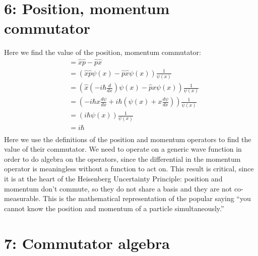 \documentclass[10pt]{article} %
\begin{document}
\section{6: Position, momentum commutator}
Here we find the value of the position, momentum commutator:
\begin{align*}
  [\hat{x}, \hat{p}] &= \hat{x}\hat{p} - \hat{p}\hat{x}\\
  &= \left(\hat{x}\hat{p}\psi(x) - \hat{p}\hat{x}\psi(x)\right)\frac{1}{\psi(x)}\\
  &= \left(\hat{x}\left(-i\hbar\frac{d}{dx}\right)\psi(x) - \hat{p}x\psi(x)\right)\frac{1}{\psi(x)}\\
  &= \left(-i\hbar x \frac{d\psi}{dx} + i\hbar\left(\psi(x)
  + x\frac{d\psi}{dx}\right)\right)\frac{1}{\psi(x)}\\
  &= \left(i\hbar\psi(x)\right)\frac{1}{\psi(x)}\\
  &= i\hbar\\
\end{align*}
Here we use the definitions of the position and momentum operators to find the value of their
commutator. We need to operate on a generic wave function in order to do algebra on the
operators, since the differential in the momentum operator is meaningless without a function
to act on. This result is critical, since it is at the heart of the Heisenberg Uncertainty
Principle: position and momentum don't commute, so they do not share a basis and they are not
co-measurable. This is the mathematical representation of the popular saying ``you cannot know
the position and momentum of a particle simultaneously.''

\section{7: Commutator algebra}
\end{document}
